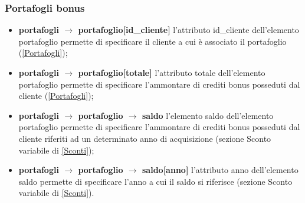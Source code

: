\documentclass[a4paper, 14pt]{article}
\begin{document}
\begin{flushleft}
			\subsubsection{Portafogli bonus} 
			\begin{itemize}
				\item \textbf{portafogli $\rightarrow$ portafoglio[id\_cliente] } l'attributo id\_cliente dell'elemento portafoglio permette di specificare il cliente a cui è associato il portafoglio (\ref{Portafogli});
				\item \textbf{portafogli $\rightarrow$ portafoglio[totale] } l'attributo totale dell'elemento portafoglio permette di specificare l'ammontare di crediti bonus posseduti dal cliente (\ref{Portafogli});
				\item \textbf{portafogli $\rightarrow$ portafoglio $\rightarrow$ saldo } l'elemento saldo dell'elemento portafoglio permette di specificare l'ammontare di crediti bonus posseduti dal cliente riferiti ad un determinato anno di acquisizione (sezione Sconto variabile di \ref{Sconti});
				\item \textbf{portafogli $\rightarrow$ portafoglio $\rightarrow$ saldo[anno] } l'attributo anno dell'elemento saldo permette di specificare l'anno
				a cui il saldo si riferisce (sezione Sconto variabile di \ref{Sconti}).
			\end{itemize}
			\smallskip


\end{flushleft}
\end{document}
